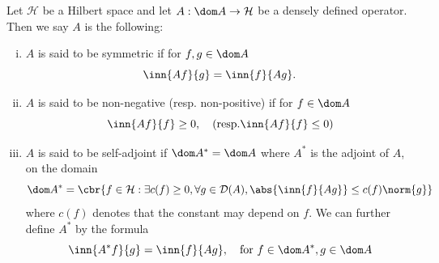 \begin{defi}\label{selfAdjoint}
	Let $\mathcal{H}$ be a Hilbert space and let $A: \dom A \to \mathcal{H}$ be a densely defined operator. Then we say $A$ is the following:
	\begin{enumerate}[(i)]
		\item $A$ is said to be symmetric if for $f,g \in \dom A$
		\begin{equation}
			\inn{Af}{g} = \inn{f}{Ag}.
		\end{equation}
		\item $A$ is said to be non-negative (resp. non-positive) if for $f \in \dom A$
		\begin{equation}
			\inn{Af}{f} \geq 0, \quad (\text{resp.}\inn{Af}{f} \leq 0)
		\end{equation}
		\item $A$ is said to be self-adjoint if $\dom A^{*} = \dom A$ where $A^{*}$ is the adjoint of $A$, on the domain
		\begin{equation}
			\dom A^{*} = \cbr{f \in \mathcal{H} : \exists c(f) \geq 0, \forall g \in \mathcal{D}(A), \abs{\inn{f}{Ag}} \leq c(f) \norm{g}}
		\end{equation}
		where $c(f)$ denotes that the constant may depend on $f$. We can further define $A^*$ by the formula
		\begin{equation}
			\inn{A^*f}{g} = \inn{f}{Ag} , \quad \text{for } f \in \dom A^*, g \in \dom A
		\end{equation}
	\end{enumerate}
\end{defi}

